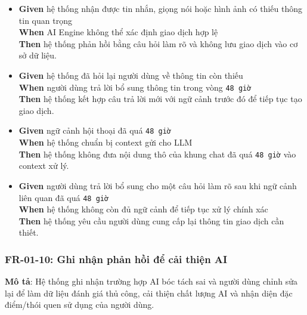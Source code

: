 \begin{itemize}
\item \textbf{Given} hệ thống nhận được tin nhắn, giọng nói hoặc hình ảnh có thiếu thông tin quan trọng  \\ \hspace*{1.5em}  \textbf{When} AI Engine không thể xác định giao dịch hợp lệ  \\ \hspace*{1.5em}  \textbf{Then} hệ thống phản hồi bằng câu hỏi làm rõ và không lưu giao dịch vào cơ sở dữ liệu.
\item \textbf{Given} hệ thống đã hỏi lại người dùng về thông tin còn thiếu  \\ \hspace*{1.5em}  \textbf{When} người dùng trả lời bổ sung thông tin trong vòng \texttt{48 giờ}  \\ \hspace*{1.5em}  \textbf{Then} hệ thống kết hợp câu trả lời mới với ngữ cảnh trước đó để tiếp tục tạo giao dịch.
\item \textbf{Given} ngữ cảnh hội thoại đã quá \texttt{48 giờ}  \\ \hspace*{1.5em}  \textbf{When} hệ thống chuẩn bị context gửi cho LLM  \\ \hspace*{1.5em}  \textbf{Then} hệ thống không đưa nội dung thô của khung chat đã quá \texttt{48 giờ} vào context xử lý.
\item \textbf{Given} người dùng trả lời bổ sung cho một câu hỏi làm rõ sau khi ngữ cảnh liên quan đã quá \texttt{48 giờ}  \\ \hspace*{1.5em}  \textbf{When} hệ thống không còn đủ ngữ cảnh để tiếp tục xử lý chính xác  \\ \hspace*{1.5em}  \textbf{Then} hệ thống yêu cầu người dùng cung cấp lại thông tin giao dịch cần thiết.
\end{itemize}
\subsubsection{FR-01-10: Ghi nhận phản hồi để cải thiện AI}

\textbf{Mô tả}: Hệ thống ghi nhận trường hợp AI bóc tách sai và người dùng chỉnh sửa lại để làm dữ liệu đánh giá thủ công, cải thiện chất lượng AI và nhận diện đặc điểm/thói quen sử dụng của người dùng.



